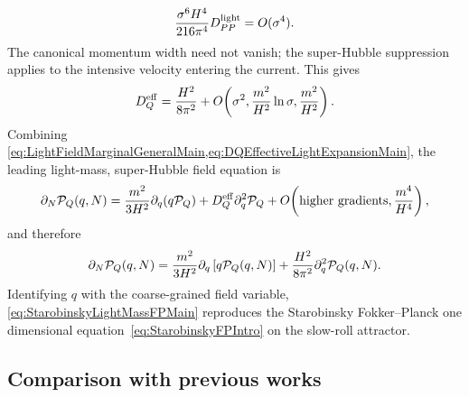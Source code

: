 \documentclass{article}
\numberwithin{equation}{section}
\begin{document}
	\begin{equation}
		\frac{\sigma^6H^4}{216\pi^4}D_{PP}^{\rm light}
		=
		O(\sigma^4).
		\label{eq:VelocityWidthScalingMain}
	\end{equation}
	The canonical momentum width need not vanish; the super-Hubble suppression applies to the intensive velocity entering the current.
	This gives
	\begin{equation}
		D_Q^{\rm eff}
		=
		\frac{H^2}{8\pi^2}
		+
		O\!\left(
		\sigma^2,
		\frac{m^2}{H^2}\ln\sigma,
		\frac{m^2}{H^2}
		\right).
		\label{eq:DQEffectiveLightExpansionMain}
	\end{equation}
	Combining \cref{eq:LightFieldMarginalGeneralMain,eq:DQEffectiveLightExpansionMain}, the leading light-mass, super-Hubble field equation is
	\begin{align}
		\partial_N{\cal P}_Q(q,N)
		=
		\frac{m^2}{3H^2}\partial_q\!\left(q{\cal P}_Q\right)
		+
		D_Q^{\rm eff}\partial_q^2{\cal P}_Q
		+
		O\!\left(
		\text{higher gradients},
		\frac{m^4}{H^4}
		\right),
		\label{eq:StarobinskyDiffusionFromReductionMain}
	\end{align}
	and therefore
	\begin{equation}
		\partial_N{\cal P}_Q(q,N)
		=
		\frac{m^2}{3H^2}
		\partial_q \left[q{\cal P}_Q(q,N)\right]
		+
		\frac{H^2}{8\pi^2}
		\partial_q^2{\cal P}_Q(q,N).
		\label{eq:StarobinskyLightMassFPMain}
	\end{equation}
    Identifying $q$ with the coarse-grained field variable, \cref{eq:StarobinskyLightMassFPMain} reproduces the Starobinsky Fokker--Planck one dimensional equation~\eqref{eq:StarobinskyFPIntro} on the slow-roll attractor.

	\subsection{Comparison with previous works}
	\label{sec:similar_works_comparison}
\end{document}
